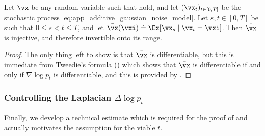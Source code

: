 \documentclass[../../book-main.tex]{subfiles}
\begin{document}
\begin{corollary}\label{cor:gribonval_A2}
    Let \(\vx\) be any random variable such that
    hold, and let \((\vx_{t})_{t \in [0, T]}\) be the stochastic
    process \eqref{eq:app_additive_gaussian_noise_model}. Let \(s, t
    \in [0, T]\) be such that \(0 \leq s < t \leq T\), and let
    \(\bar{\vx}(\vxi) \doteq \Ex[\vx_{s} \mid \vx_{t} = \vxi]\). Then
    \(\bar{\vx}\) is injective, and therefore invertible onto its range.
\end{corollary}
\begin{proof}
    The only thing left to show is that \(\bar{\vx}\) is
    differentiable,  but this is immediate from Tweedie's formula
    () which shows that \(\bar{\vx}\) is
    differentiable if and only if \(\nabla \log p_{t}\) is
    differentiable, and this is provided by .
\end{proof}

\subsubsection{Controlling the Laplacian \(\Delta \log p_{t}\)}

Finally, we develop a technical estimate which is required for the
proof of  and actually
motivates the assumption for the viable \(t\).
\end{document}

